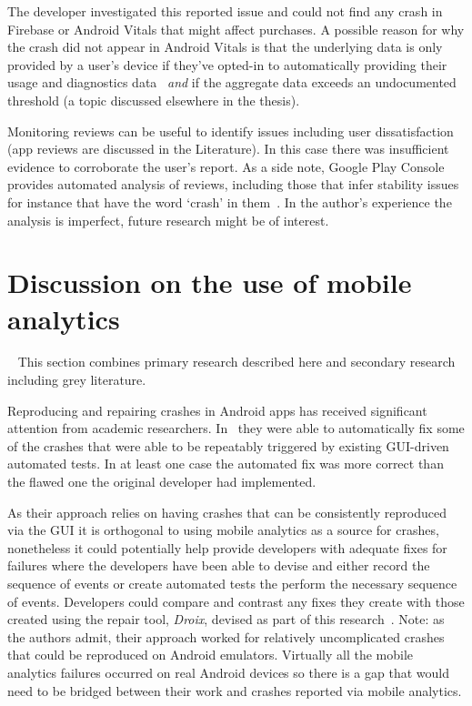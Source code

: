 The developer investigated this reported issue and could not find any crash in Firebase or Android Vitals that might affect purchases. A possible reason for why the crash did not appear in Android Vitals is that the underlying data is only provided by a user's device if they've opted-in to automatically providing their usage and diagnostics data~ \textit{and} if the aggregate data exceeds an undocumented threshold (a topic discussed elsewhere in the thesis). 

Monitoring reviews can be useful to identify issues including user dissatisfaction (app reviews are discussed in the Literature). In this case there was insufficient evidence to corroborate the user's report. As a side note, Google Play Console provides automated analysis of reviews, including those that infer stability issues for instance that have the word `crash' in them~. In the author's experience the analysis is imperfect, future research might be of interest.






\section{Discussion on the use of mobile analytics}~\label{aiu-discussion-section}
This section combines primary research described here and secondary research including grey literature.


 Reproducing and repairing crashes in Android apps has received significant attention from academic researchers. In~ they were able to automatically fix some of the crashes that were able to be repeatably triggered by existing GUI-driven automated tests. In at least one case the automated fix was more correct than the flawed one the original developer had implemented. 

As their approach relies on having crashes that can be consistently reproduced via the GUI it is orthogonal to using mobile analytics as a source for crashes, nonetheless it could potentially help provide developers with adequate fixes for failures where the developers have been able to devise and either record the sequence of events or create automated tests the perform the necessary sequence of events. Developers could compare and contrast any fixes they create with those created using the repair tool, \textit{Droix}, devised as part of this research~. Note: as the authors admit, their approach worked for relatively uncomplicated crashes that could be reproduced on Android emulators. Virtually all the mobile analytics failures occurred on real Android devices so there is a gap that would need to be bridged between their work and crashes reported via mobile analytics.  

